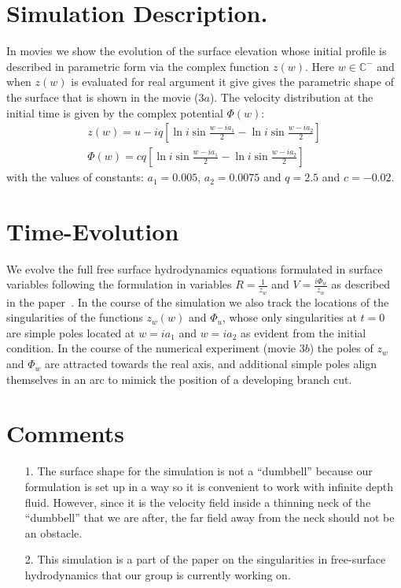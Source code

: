 \documentclass[11pt]{article}
\begin{document}
\section{Simulation Description.}
In movies we show the evolution of the surface elevation whose initial profile is described in parametric form 
via the complex function $z(w)$. Here $w\in\mathbb{C}^-$ and when $z(w)$ is evaluated for real argument it 
give gives the parametric shape of the surface that is shown in the movie ($3a$). The velocity distribution at 
the initial time is given by the complex potential $\Phi(w)$:
\begin{align}
z(w) = u - iq\left[ \ln i \sin \frac{w-ia_1}{2}  - \ln i \sin\frac{w-ia_2}{2}\right] \\
\Phi(w) = cq\left[ \ln i\sin\frac{w-ia_1}{2} - \ln i \sin\frac{w-ia_2}{2} \right]
\end{align}
with the values of constants: $a_1 = 0.005$, $a_2 = 0.0075$ and $q = 2.5$ and $c = -0.02$. 

\section{Time-Evolution}
We evolve the full free surface hydrodynamics equations formulated in surface variables following the formulation 
in variables $R = \frac{1}{z_w}$ and $V = \frac{i\Phi_w}{z_w}$ as described in the paper~\cite{AIDyachenko2001}.
In the course of the simulation we also track the locations of the singularities of the functions $z_w(w)$ and 
$\Phi_u$, whose only singularities at $t = 0$ are simple poles located at $w = ia_1$ and $w = ia_2$ as evident 
from the initial condition. In the course of the numerical experiment (movie $3b$) the poles of $z_w$ and $\Phi_w$
are attracted towards the real axis, and additional simple poles align themselves in an arc to mimick the position 
of a developing branch cut. 

\section{Comments}
\begin{itemize}
\item[1.]{The surface shape for the simulation is not a ``dumbbell'' because our formulation is set up in a way so it is
convenient to work with infinite depth fluid. However, since it is the velocity field inside a thinning neck of the ``dumbbell'' 
that we are after, the far field away from the neck should not be an obstacle.}
\item[2.]{This simulation is a part of the paper on the singularities in free-surface hydrodynamics that our group is currently 
working on.}
\end{itemize}



\end{document}

